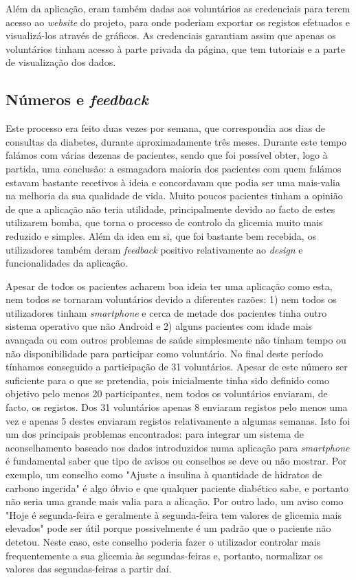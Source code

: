 Além da aplicação, eram também dadas aos voluntários as credenciais para terem acesso ao \textit{website} do projeto, para onde poderiam exportar os registos efetuados e visualizá-los através de gráficos. As credenciais garantiam assim que apenas os voluntários tinham acesso à parte privada da página, que tem tutoriais e a parte de visualização dos dados.


\subsection{Números e \textit{feedback}}

Este processo era feito duas vezes por semana, que correspondia aos dias de consultas da diabetes, durante aproximadamente três meses. Durante este tempo falámos com várias dezenas de pacientes, sendo que foi possível obter, logo à partida, uma conclusão: a esmagadora maioria dos pacientes com quem falámos estavam bastante recetivos à ideia e concordavam que podia ser uma mais-valia na melhoria da sua qualidade de vida. Muito poucos pacientes tinham a opinião de que a aplicação não teria utilidade, principalmente devido ao facto de estes utilizarem bomba, que torna o processo de controlo da glicemia muito mais reduzido e simples.
Além da idea em si, que foi bastante bem recebida, os utilizadores também deram \textit{feedback} positivo relativamente ao \textit{design} e funcionalidades da aplicação. 

Apesar de todos os pacientes acharem boa ideia ter uma aplicação como esta, nem todos se tornaram voluntários devido a diferentes razões: 1) nem todos os utilizadores tinham \textit{smartphone} e cerca de metade dos pacientes tinha outro sistema operativo que não Android e 2) alguns pacientes com idade mais avançada ou com outros problemas de saúde simplesmente não tinham tempo ou não disponibilidade para participar como voluntário. 
No final deste período tínhamos conseguido a participação de 31 voluntários. Apesar de este número ser suficiente para o que se pretendia, pois inicialmente tinha sido definido como objetivo pelo menos 20 participantes, nem todos os voluntários enviaram, de facto, os registos. 
Dos 31 voluntários apenas 8 enviaram registos pelo menos uma vez e apenas 5 destes enviaram registos relativamente a algumas semanas. Isto foi um dos principais problemas encontrados: para integrar um sistema de aconselhamento baseado nos dados introduzidos numa aplicação para \textit{smartphone} é fundamental saber que tipo de avisos ou conselhos se deve ou não mostrar. Por exemplo, um conselho como "Ajuste a insulina à quantidade de hidratos de carbono ingerida" é algo óbvio e que qualquer paciente diabético sabe, e portanto não seria uma grande mais valia para a alicação. Por outro lado, um aviso como "Hoje é segunda-feira e geralmente à segunda-feira tem valores de glicemia mais elevados" pode ser útil porque possivelmente é um padrão que o paciente não detetou. Neste caso, este conselho poderia fazer o utilizador controlar mais frequentemente a sua glicemia às segundas-feiras e, portanto, normalizar os valores das segundas-feiras a partir daí. 

